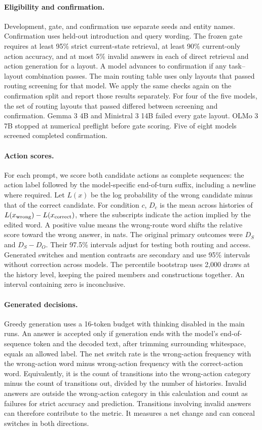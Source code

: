 \documentclass[letterpaper]{article}
\begin{document}

\paragraph{Eligibility and confirmation.}
Development, gate, and confirmation use separate seeds and entity names. Confirmation uses held-out introduction and query wording. The frozen gate requires at least 95\% strict current-state retrieval, at least 90\% current-only action accuracy, and at most 5\% invalid answers in each of direct retrieval and action generation for a layout. A model advances to confirmation if any task--layout combination passes. The main routing table uses only layouts that passed routing screening for that model. We apply the same checks again on the confirmation split and report those results separately. For four of the five models, the set of routing layouts that passed differed between screening and confirmation. Gemma 3 4B and Ministral 3 14B failed every gate layout. OLMo 3 7B stopped at numerical preflight before gate scoring. Five of eight models screened completed confirmation.

\paragraph{Action scores.}
For each prompt, we score both candidate actions as complete sequences: the action label followed by the model-specific end-of-turn suffix, including a newline where required. Let $L(x)$ be the log probability of the wrong candidate minus that of the correct candidate. For condition $c$, $D_c$ is the mean across histories of $L(x_{\rm wrong})-L(x_{\rm correct})$, where the subscripts indicate the action implied by the edited word. A positive value means the wrong-route word shifts the relative score toward the wrong answer, in nats. The original primary outcomes were $D_S$ and $D_S-D_O$. Their 97.5\% intervals adjust for testing both routing and access. Generated switches and mention contrasts are secondary and use 95\% intervals without correction across models. The percentile bootstrap uses 2,000 draws at the history level, keeping the paired members and constructions together. An interval containing zero is inconclusive.

\paragraph{Generated decisions.}
Greedy generation uses a 16-token budget with thinking disabled in the main runs. An answer is accepted only if generation ends with the model's end-of-sequence token and the decoded text, after trimming surrounding whitespace, equals an allowed label. The net switch rate is the wrong-action frequency with the wrong-action word minus wrong-action frequency with the correct-action word. Equivalently, it is the count of transitions into the wrong-action category minus the count of transitions out, divided by the number of histories. Invalid answers are outside the wrong-action category in this calculation and count as failures for strict accuracy and prediction. Transitions involving invalid answers can therefore contribute to the metric. It measures a net change and can conceal switches in both directions.
\end{document}
